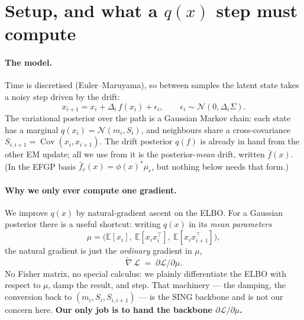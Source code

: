 \documentclass[11pt]{article}
\newcommand{\E}{\mathbb{E}}
\newcommand{\Cov}{\operatorname{Cov}}
\begin{document}
\section{Setup, and what a \texorpdfstring{$q(x)$}{q(x)} step must compute}

\paragraph{The model.}
Time is discretised (Euler--Maruyama), so between samples the latent state
takes a noisy step driven by the drift:
\begin{equation}
x_{i+1} = x_i + \Delta_i\, f(x_i) + \epsilon_i,
\qquad \epsilon_i \sim \mathcal N(0,\Delta_i\Sigma).
\label{eq:euler}
\end{equation}
The variational posterior over the path is a Gaussian Markov chain: each
state has a marginal $q(x_i)=\mathcal N(m_i,S_i)$, and neighbours share a
cross-covariance $S_{i,i+1}=\Cov(x_i,x_{i+1})$. The drift posterior
$q(f)$ is already in hand from the other EM update; all we use from it is
the posterior-\emph{mean} drift, written $\bar f(x)$. (In the EFGP basis
$\bar f_r(x)=\phi(x)^*\mu_r$, but nothing below needs that form.)

\paragraph{Why we only ever compute one gradient.}
We improve $q(x)$ by natural-gradient ascent on the ELBO. For a Gaussian
posterior there is a useful shortcut: writing $q(x)$ in its
\emph{mean parameters}
\begin{equation}
\mu = \bigl(\E[x_i],\ \E[x_ix_i^\top],\ \E[x_ix_{i+1}^\top]\bigr),
\end{equation}
the natural gradient is just the \emph{ordinary} gradient in $\mu$,
\begin{equation}
\widetilde\nabla\,\mathcal L \;=\; \partial\mathcal L/\partial\mu .
\label{eq:duality}
\end{equation}
No Fisher matrix, no special calculus: we plainly differentiate the ELBO
with respect to $\mu$, damp the result, and step. That machinery --- the
damping, the conversion back to $(m_i,S_i,S_{i,i+1})$ --- is the SING
backbone and is not our concern here. \textbf{Our only job is to hand the
backbone $\partial\mathcal L/\partial\mu$.}
\end{document}
